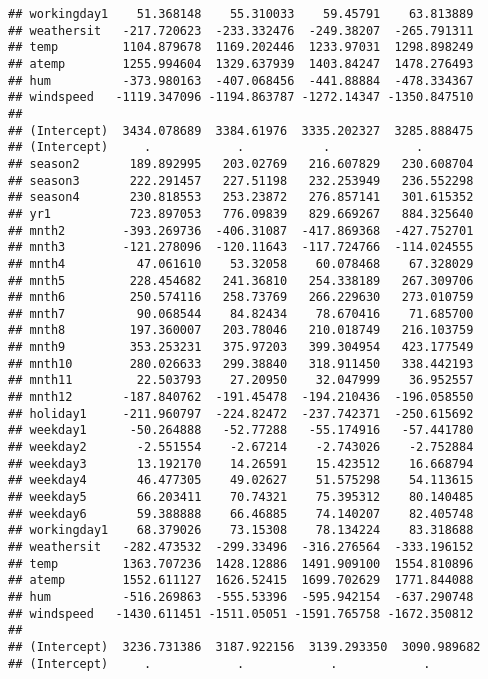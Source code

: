 \documentclass[]{article}
\begin{document}
\begin{verbatim}
## workingday1    51.368148    55.310033    59.45791    63.813889
## weathersit   -217.720623  -233.332476  -249.38207  -265.791311
## temp         1104.879678  1169.202446  1233.97031  1298.898249
## atemp        1255.994604  1329.637939  1403.84247  1478.276493
## hum          -373.980163  -407.068456  -441.88884  -478.334367
## windspeed   -1119.347096 -1194.863787 -1272.14347 -1350.847510
##                                                               
## (Intercept)  3434.078689  3384.61976  3335.202327  3285.888475
## (Intercept)     .            .           .            .       
## season2       189.892995   203.02769   216.607829   230.608704
## season3       222.291457   227.51198   232.253949   236.552298
## season4       230.818553   253.23872   276.857141   301.615352
## yr1           723.897053   776.09839   829.669267   884.325640
## mnth2        -393.269736  -406.31087  -417.869368  -427.752701
## mnth3        -121.278096  -120.11643  -117.724766  -114.024555
## mnth4          47.061610    53.32058    60.078468    67.328029
## mnth5         228.454682   241.36810   254.338189   267.309706
## mnth6         250.574116   258.73769   266.229630   273.010759
## mnth7          90.068544    84.82434    78.670416    71.685700
## mnth8         197.360007   203.78046   210.018749   216.103759
## mnth9         353.253231   375.97203   399.304954   423.177549
## mnth10        280.026633   299.38840   318.911450   338.442193
## mnth11         22.503793    27.20950    32.047999    36.952557
## mnth12       -187.840762  -191.45478  -194.210436  -196.058550
## holiday1     -211.960797  -224.82472  -237.742371  -250.615692
## weekday1      -50.264888   -52.77288   -55.174916   -57.441780
## weekday2       -2.551554    -2.67214    -2.743026    -2.752884
## weekday3       13.192170    14.26591    15.423512    16.668794
## weekday4       46.477305    49.02627    51.575298    54.113615
## weekday5       66.203411    70.74321    75.395312    80.140485
## weekday6       59.388888    66.46885    74.140207    82.405748
## workingday1    68.379026    73.15308    78.134224    83.318688
## weathersit   -282.473532  -299.33496  -316.276564  -333.196152
## temp         1363.707236  1428.12886  1491.909100  1554.810896
## atemp        1552.611127  1626.52415  1699.702629  1771.844088
## hum          -516.269863  -555.53396  -595.942154  -637.290748
## windspeed   -1430.611451 -1511.05051 -1591.765758 -1672.350812
##                                                                
## (Intercept)  3236.731386  3187.922156  3139.293350  3090.989682
## (Intercept)     .            .            .            .       

\end{verbatim}
\end{document}
